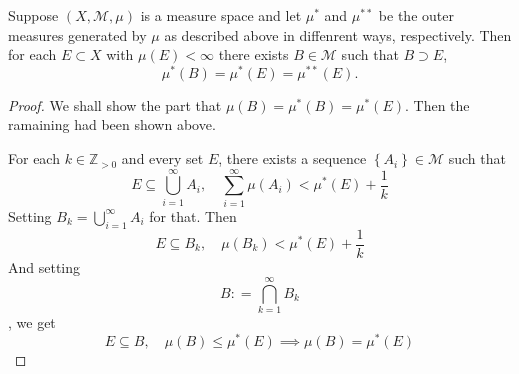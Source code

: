 \documentclass[../main.tex]{subfiles}
\begin{document}
\begin{theorem}{}{}
Suppose $(X,\mathcal{M},\mu)$ is a measure space and let $\mu^*$ and $\mu^{**}$ be the outer measures generated by $\mu$ as described above in diffenrent ways, respectively. Then for each $E \subset X$ with $\mu(E) < \infty$ there exists $B \in \mathcal{M}$ such that $B \supset E$,
\[ \mu^*(B) = \mu^*(E) = \mu^{**}(E). \]
\end{theorem}
\begin{proof}
    We shall show the part that \(  \mu \left( B \right)= \mu ^{*}\left( B \right)= \mu ^{*}\left( E \right)     \). Then the ramaining had been shown above. 

    For each \(k \in \mathbb{Z} _{> 0}  \) and every set \(  E  \), there exists a sequence \(  \left\{ A_{i} \right\}\in \mathcal{M}  \) such that  \[
    E\subseteq \bigcup _{i= 1}^{\infty}A_{i},\quad \sum _{i= 1}^{\infty}\mu \left( A_{i} \right) < \mu ^{*}\left( E \right)+  \frac{1 }{k }  
    \]  Setting \(  B_{k} = \bigcup _{i= 1}^{\infty}A_{i}  \) for that.  Then \[
    E\subseteq B_{k},\quad \mu \left( B _{k}\right)< \mu ^{*}\left( E \right)+ \frac{1 }{k }   
    \] And setting \[
    B: = \bigcap_{k= 1}^{\infty}B_{k} 
    \], we get \[
    E\subseteq B,\quad \mu \left( B \right)\le \mu ^{*}\left( E \right)  \implies \mu \left( B \right)= \mu ^{*}\left( E \right)  
    \]
\end{proof}
\end{document}

